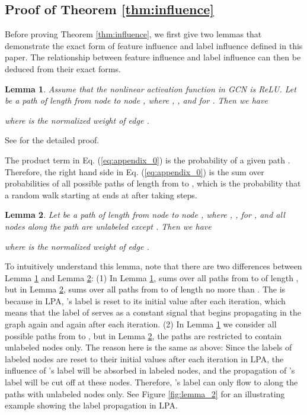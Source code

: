 \documentclass{article}
\newtheorem{lemma}{Lemma}
\newenvironment{proof}{{\noindent\it Proof.}\quad}{\hfill \par}
\begin{document}
		
	\subsection{Proof of Theorem \ref{thm:influence}}
	\label{app:b}
		Before proving Theorem \ref{thm:influence}, we first give two lemmas that demonstrate the exact form of feature influence and label influence defined in this paper.
		The relationship between feature influence and label influence can then be deduced from their exact forms.
		\begin{lemma}
		\label{lemma:1}
			Assume that the nonlinear activation function in GCN is ReLU.
			Let  be a path  of length  from node  to node , where , , and  for .
			Then we have
			
			where  is the normalized weight of edge .
		\end{lemma}
		
		\begin{proof}
			See \cite{xu2018representation} for the detailed proof.
		\end{proof}
		
		The product term in Eq. (\ref{eq:appendix_0}) is the probability of a given path .
		Therefore, the right hand side in Eq. (\ref{eq:appendix_0}) is the sum over probabilities of all possible paths of length  from  to , which is the probability that a random walk starting at  ends at  after taking  steps.
		
		\begin{lemma}
		\label{lemma:2}
			Let  be a path  of length  from node  to node , where , ,  for , and all nodes along the path are unlabeled except .
			Then we have
			
			where  is the normalized weight of edge .
		\end{lemma}
		
		To intuitively understand this lemma, note that there are two differences between Lemma \ref{lemma:1} and Lemma \ref{lemma:2}:
		(1) In Lemma \ref{lemma:1},  sums over all paths from  to  of length , but in Lemma \ref{lemma:2},  sums over all paths from  to  of length no more than .
		The is because in LPA, 's label is reset to its initial value after each iteration, which means that the label of  serves as a constant signal that begins propagating in the graph again and again after each iteration.
		(2) In Lemma \ref{lemma:1} we consider all possible paths from  to , but in Lemma \ref{lemma:2}, the paths are restricted to contain unlabeled nodes only.
		The reason here is the same as above:
		Since the labels of labeled nodes are reset to their initial values after each iteration in LPA, the influence of 's label will be absorbed in labeled nodes, and the propagation of 's label will be cut off at these nodes.
		Therefore, 's label can only flow to  along the paths with unlabeled nodes only.
		See Figure \ref{fig:lemma_2} for an illustrating example showing the label propagation in LPA.
		
\end{document}
